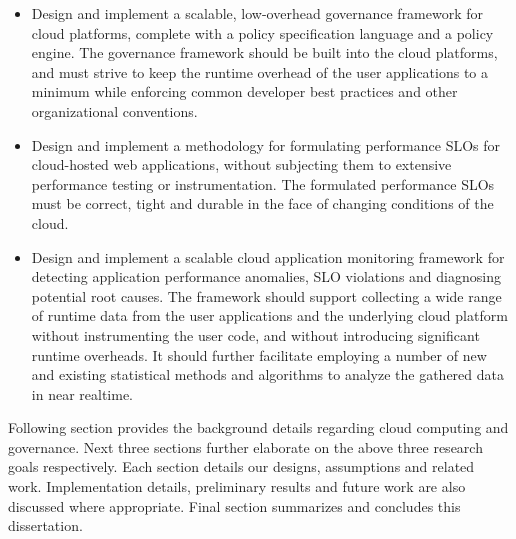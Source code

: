 \begin{itemize}
\item Design and implement a scalable, low-overhead governance framework for cloud platforms,
complete with a policy specification language and a policy engine. The governance framework should be
built into the cloud platforms, and must
strive to keep the runtime overhead of the user applications to a minimum while enforcing
common developer best practices and other organizational conventions.
\item Design and implement a methodology for formulating performance SLOs for cloud-hosted 
 web applications, without
 subjecting them to extensive performance testing or instrumentation. The formulated
 performance SLOs must be correct, tight and durable in the face of changing
 conditions of the cloud.
 \item Design and implement a scalable cloud application monitoring framework for detecting
application performance anomalies, SLO violations and diagnosing potential root causes. 
The framework should support collecting
 a wide range of runtime data from the user applications and the underlying cloud platform
 without instrumenting the user code, and without introducing significant runtime overheads.
 It should further facilitate employing a number of new and existing statistical methods
 and algorithms to analyze the gathered data in near realtime.
\end{itemize}

Following section provides the background details regarding cloud computing and governance.
Next three sections further elaborate on the above three research goals respectively. 
Each section details our designs, assumptions and related work. Implementation details,
preliminary results and future work are also discussed where appropriate. Final section
summarizes and concludes this dissertation.